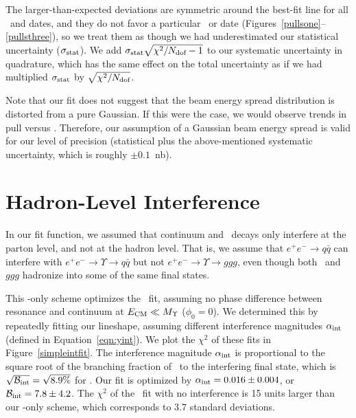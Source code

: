 \documentclass{cornell}
\begin{document}
The larger-than-expected deviations are symmetric around the best-fit
line for all \ecm\ and dates, and they do not favor a particular \ecm\
or date (Figures~\ref{pullsone}--\ref{pullsthree}), so we treat them
as though we had underestimated our statistical uncertainty
($\sigma_{\mbox{\scriptsize stat}}$).  We add $\sigma_{\mbox{\scriptsize stat}}
\sqrt{\chi^2/N_{\mbox{\scriptsize dof}} - 1}$ to our systematic uncertainty in
\label{sec:chichiconsistency} quadrature, which has the same effect on
the total uncertainty as if we had multiplied $\sigma_{\mbox{\scriptsize stat}}$ by
$\sqrt{\chi^2/N_{\mbox{\scriptsize dof}}}$.

Note that our fit does not suggest that the beam energy spread
distribution is distorted from a pure Gaussian.  If this were the
case, we would observe trends in pull versus \ecm.  Therefore, our
assumption of a Gaussian beam energy spread is valid for our level of
precision (statistical plus the above-mentioned systematic
uncertainty, which is roughly $\pm 0.1$~nb).

\section{Hadron-Level Interference}
\label{sec:interference}

In our fit function, we assumed that continuum and \ups\ decays only
interfere at the parton level, and not at the hadron level.  That is,
we assume that $e^+e^- \to q\bar{q}$ can interfere with $e^+e^- \to
\Upsilon \to q\bar{q}$ but not $e^+e^- \to \Upsilon \to ggg$, even
though both \qqbar\ and $ggg$ hadronize into some of the same final
states.

This \qqbar-only scheme optimizes the \us\ fit, assuming no phase
difference between resonance and continuum at $E_{\mbox{\scriptsize CM}} \ll
M_\Upsilon$ ($\phi_0=0$).  We determined this by repeatedly fitting
our lineshape, assuming different interference magnitudes
$\alpha_{\mbox{\scriptsize int}}$ (defined in Equation~\ref{eqn:yint}).  We plot the
$\chi^2$ of these fits in Figure~\ref{simpleintfit}.  The interference
magnitude $\alpha_{\mbox{\scriptsize int}}$ is proportional to the square root of
the branching fraction of \ups\ to the interfering final state, which
is $\sqrt{{\mathcal B}_{\mbox{\scriptsize int}}} = \sqrt{8.9\%}$ for \qqbar.  Our
fit is optimized by $\alpha_{\mbox{\scriptsize int}} = 0.016 \pm 0.004$, or
${\mathcal B}_{\mbox{\scriptsize int}} = 7.8 \pm 4.2$.  The $\chi^2$ of the \us\ fit
with no interference is 15 units larger than our \qqbar-only scheme,
which corresponds to 3.7 standard deviations.
\end{document}
